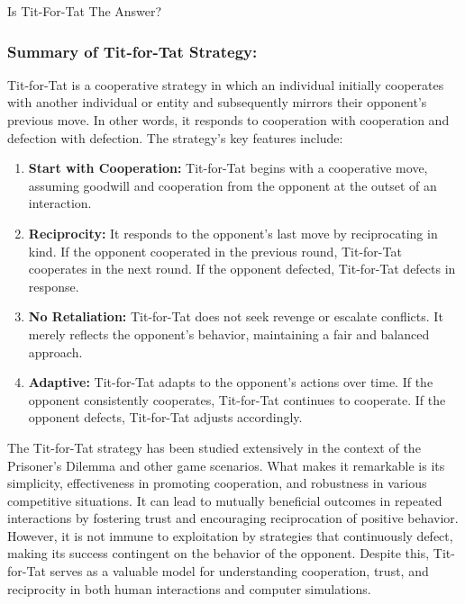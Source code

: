 \begin{notes}{Is Tit-For-Tat The Answer?}
    \subsubsection*{Summary of Tit-for-Tat Strategy:}

    Tit-for-Tat is a cooperative strategy in which an individual initially cooperates with another individual or entity and subsequently mirrors their opponent's previous move. In other words, it 
    responds to cooperation with cooperation and defection with defection. The strategy's key features include:

    \begin{enumerate}
        \item \textbf{Start with Cooperation:} Tit-for-Tat begins with a cooperative move, assuming goodwill and cooperation from the opponent at the outset of an interaction.
        \item \textbf{Reciprocity:} It responds to the opponent's last move by reciprocating in kind. If the opponent cooperated in the previous round, Tit-for-Tat cooperates in the next round. If 
        the opponent defected, Tit-for-Tat defects in response.
        \item \textbf{No Retaliation:} Tit-for-Tat does not seek revenge or escalate conflicts. It merely reflects the opponent's behavior, maintaining a fair and balanced approach.
        \item \textbf{Adaptive:} Tit-for-Tat adapts to the opponent's actions over time. If the opponent consistently cooperates, Tit-for-Tat continues to cooperate. If the opponent defects, 
        Tit-for-Tat adjusts accordingly.
    \end{enumerate}
    
    The Tit-for-Tat strategy has been studied extensively in the context of the Prisoner's Dilemma and other game scenarios. What makes it remarkable is its simplicity, effectiveness in promoting 
    cooperation, and robustness in various competitive situations. It can lead to mutually beneficial outcomes in repeated interactions by fostering trust and encouraging reciprocation of positive 
    behavior. However, it is not immune to exploitation by strategies that continuously defect, making its success contingent on the behavior of the opponent. Despite this, Tit-for-Tat serves as a 
    valuable model for understanding cooperation, trust, and reciprocity in both human interactions and computer simulations.
\end{notes}